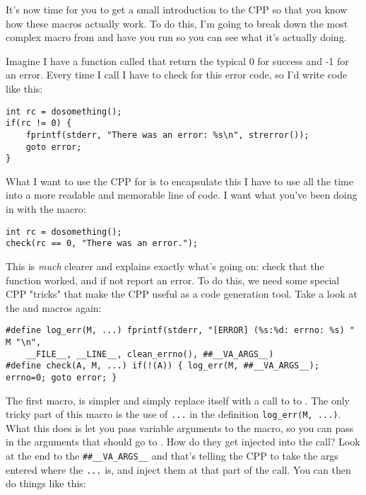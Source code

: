 It's now time for you to get a small introduction to the CPP so that you
know how these macros actually work.  To do this, I'm going to break down
the most complex macro from  and have you run  so
you can see what it's actually doing.

Imagine I have a function called  that return the typical
0 for success and -1 for an error.  Every time I call  I have
to check for this error code, so I'd write code like this:

\begin{Verbatim}
int rc = dosomething();
if(rc != 0) {
    fprintf(stderr, "There was an error: %s\n", strerror());
    goto error;
}
\end{Verbatim}

What I want to use the CPP for is to encapsulate this  I have
to use all the time into a more readable and memorable line of code.  I want
what you've been doing in  with the  macro:

\begin{Verbatim}
int rc = dosomething();
check(rc == 0, "There was an error.");
\end{Verbatim}

This is \emph{much} clearer and explains exactly what's going on: check that the 
function worked, and if not report an error.  To do this, we need some special
CPP "tricks" that make the CPP useful as a code generation tool.  Take a look
at the  and  macros again:

\begin{Verbatim}
#define log_err(M, ...) fprintf(stderr, "[ERROR] (%s:%d: errno: %s) " M "\n",
    __FILE__, __LINE__, clean_errno(), ##__VA_ARGS__)
#define check(A, M, ...) if(!(A)) { log_err(M, ##__VA_ARGS__); errno=0; goto error; }
\end{Verbatim}

The first macro,  is simpler and simply replace itself with a
call to  to .  The only tricky part of this macro
is the use of \verb|...| in the definition \verb|log_err(M, ...)|.  What this
does is let you pass variable arguments to the macro, so you can pass in the
arguments that should go to .  How do they get injected into the
 call?  Look at the end to the \verb|##__VA_ARGS__| and
that's telling the CPP to take the args entered where the \verb|...| is, and
inject them at that part of the  call.  You can then do things
like this:

